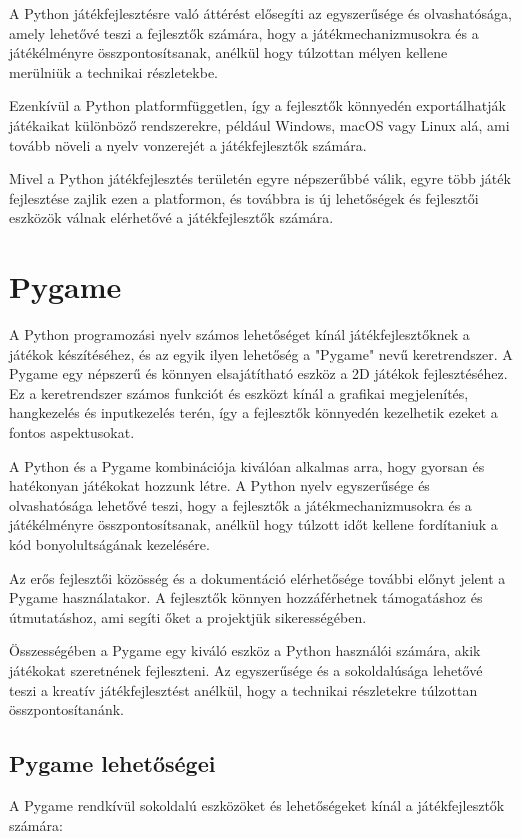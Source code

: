 A Python játékfejlesztésre való áttérést elősegíti az egyszerűsége és olvashatósága, amely lehetővé teszi a fejlesztők számára, hogy a játékmechanizmusokra és a játékélményre összpontosítsanak, anélkül hogy túlzottan mélyen kellene merülniük a technikai részletekbe.

Ezenkívül a Python platformfüggetlen, így a fejlesztők könnyedén exportálhatják játékaikat különböző rendszerekre, például Windows, macOS vagy Linux alá, ami tovább növeli a nyelv vonzerejét a játékfejlesztők számára.

Mivel a Python játékfejlesztés területén egyre népszerűbbé válik, egyre több játék fejlesztése zajlik ezen a platformon, és továbbra is új lehetőségek és fejlesztői eszközök válnak elérhetővé a játékfejlesztők számára.

\section{Pygame}
A Python programozási nyelv számos lehetőséget kínál játékfejlesztőknek a játékok készítéséhez, és az egyik ilyen lehetőség a "Pygame" nevű keretrendszer. A Pygame egy népszerű és könnyen elsajátítható eszköz a 2D játékok fejlesztéséhez. Ez a keretrendszer számos funkciót és eszközt kínál a grafikai megjelenítés, hangkezelés és inputkezelés terén, így a fejlesztők könnyedén kezelhetik ezeket a fontos aspektusokat.

A Python és a Pygame kombinációja kiválóan alkalmas arra, hogy gyorsan és hatékonyan játékokat hozzunk létre. A Python nyelv egyszerűsége és olvashatósága lehetővé teszi, hogy a fejlesztők a játékmechanizmusokra és a játékélményre összpontosítsanak, anélkül hogy túlzott időt kellene fordítaniuk a kód bonyolultságának kezelésére.

Az erős fejlesztői közösség és a dokumentáció elérhetősége további előnyt jelent a Pygame használatakor. A fejlesztők könnyen hozzáférhetnek támogatáshoz és útmutatáshoz, ami segíti őket a projektjük sikerességében.

Összességében a Pygame egy kiváló eszköz a Python használói számára, akik játékokat szeretnének fejleszteni. Az egyszerűsége és a sokoldalúsága lehetővé teszi a kreatív játékfejlesztést anélkül, hogy a technikai részletekre túlzottan összpontosítanánk.
\subsection{Pygame lehetőségei}
A Pygame rendkívül sokoldalú eszközöket és lehetőségeket kínál a játékfejlesztők számára:

